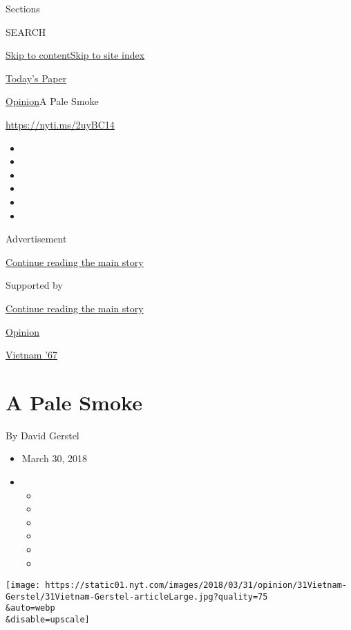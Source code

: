 Sections

SEARCH

\protect\hyperlink{site-content}{Skip to
content}\protect\hyperlink{site-index}{Skip to site index}

\href{https://myaccount.nytimes.com/auth/login?response_type=cookie\&client_id=vi}{}

\href{https://www.nytimes.com/section/todayspaper}{Today's Paper}

\href{/section/opinion}{Opinion}\textbar{}A Pale Smoke

\href{https://nyti.ms/2uyBC14}{https://nyti.ms/2uyBC14}

\begin{itemize}
\item
\item
\item
\item
\item
\item
\end{itemize}

Advertisement

\protect\hyperlink{after-top}{Continue reading the main story}

Supported by

\protect\hyperlink{after-sponsor}{Continue reading the main story}

\href{/section/opinion}{Opinion}

\href{/column/vietnam-67}{Vietnam '67}

\hypertarget{a-pale-smoke}{%
\section{A Pale Smoke}\label{a-pale-smoke}}

By David Gerstel

\begin{itemize}
\item
  March 30, 2018
\item
  \begin{itemize}
  \item
  \item
  \item
  \item
  \item
  \item
  \end{itemize}
\end{itemize}

\texttt{[image: https://static01.nyt.com/images/2018/03/31/opinion/31Vietnam-Gerstel/31Vietnam-Gerstel-articleLarge.jpg?quality=75\\\&auto=webp\\\&disable=upscale]}

